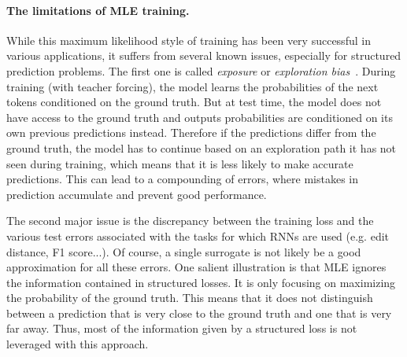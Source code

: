 \documentclass{article}
\begin{document}
	\vspace{-1.5mm}
	\paragraph{The limitations of MLE training.}
	While this maximum likelihood style of training has been very successful in various applications, it suffers from several known issues, especially for structured prediction problems.
	The first one is called \textit{exposure} or \textit{exploration bias}~\citep{Ranzato2016b}.
	During training (with teacher forcing), the model learns the probabilities of the next tokens conditioned on the ground truth.
	But at test time, the model does not have access to the ground truth and outputs probabilities are conditioned on its own previous predictions instead.
	Therefore if the predictions differ from the ground truth, the model has to continue based on an exploration path it has not seen during training, which means that it is less likely to make accurate predictions.
	This can lead to a compounding of errors, where mistakes in prediction accumulate and prevent good performance.

	The second major issue is the discrepancy between the training loss and the various test errors associated with the tasks for which RNNs are used (e.g. edit distance, F1 score...).
	Of course, a single surrogate is not likely be a good approximation for all these errors.
	One salient illustration is that MLE ignores the information contained in structured losses.
	It is only focusing on maximizing the probability of the ground truth.
	This means that it does not distinguish between a prediction that is very close to the ground truth and one that is very far away.
	Thus, most of the information given by a structured loss is not leveraged with this approach.

	\vspace{-2mm}
\end{document}
